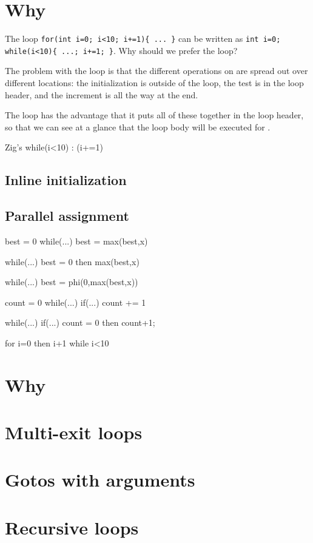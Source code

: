 \section{Why }

The loop \lstinline|for(int i=0; i<10; i+=1){ ... }| can be written as \lstinline|int i=0; while(i<10){ ...; i+=1; }|. Why should we prefer the  loop?

The problem with the  loop is that the different operations on  are spread out over different locations: the initialization is outside of the loop, the test is in the loop header, and the increment is all the way at the end.

The  loop has the advantage that it puts all of these together in the loop header, so that we can see at a glance that the loop body will be executed for .

Zig's while(i<10) : (i+=1)

\subsection{Inline initialization}

\subsection{Parallel assignment}

best = 0
while(...){
  best = max(best,x)
}

while(...){
  best = 0 then max(best,x)
}

while(...){
  best = phi(0,max(best,x))
}

count = 0
while(...){
  if(...){
    count += 1
  }
}

while(...){
  if(...){
    count = 0 then count+1;
  }
}


for i=0 then i+1 while i<10

\section{Why }

\section{Multi-exit loops}

\section{Gotos with arguments}

\section{Recursive loops}





